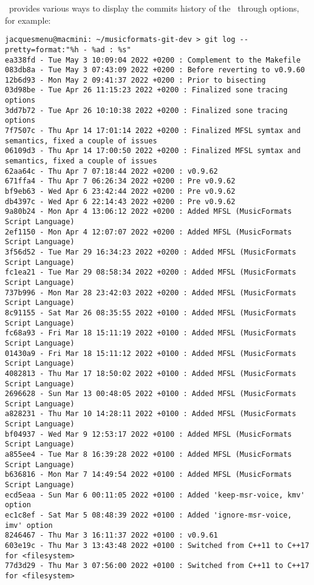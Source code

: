\git\ provides various ways to display the commits history of the \repo\ through  options, for example:
\begin{lstlisting}[language=Terminal]
jacquesmenu@macmini: ~/musicformats-git-dev > git log --pretty=format:"%h - %ad : %s"
ea338fd - Tue May 3 10:09:04 2022 +0200 : Complement to the Makefile
083db8a - Tue May 3 07:43:09 2022 +0200 : Before reverting to v0.9.60
12b6d93 - Mon May 2 09:41:37 2022 +0200 : Prior to bisecting
03d98be - Tue Apr 26 11:15:23 2022 +0200 : Finalized sone tracing options
3dd7b72 - Tue Apr 26 10:10:38 2022 +0200 : Finalized sone tracing options
7f7507c - Thu Apr 14 17:01:14 2022 +0200 : Finalized MFSL symtax and semantics, fixed a couple of issues
06109d3 - Thu Apr 14 17:00:50 2022 +0200 : Finalized MFSL symtax and semantics, fixed a couple of issues
62aa64c - Thu Apr 7 07:18:44 2022 +0200 : v0.9.62
671ffa4 - Thu Apr 7 06:26:34 2022 +0200 : Pre v0.9.62
bf9eb63 - Wed Apr 6 23:42:44 2022 +0200 : Pre v0.9.62
db4397c - Wed Apr 6 22:14:43 2022 +0200 : Pre v0.9.62
9a80b24 - Mon Apr 4 13:06:12 2022 +0200 : Added MFSL (MusicFormats Script Language)
2ef1150 - Mon Apr 4 12:07:07 2022 +0200 : Added MFSL (MusicFormats Script Language)
3f56d52 - Tue Mar 29 16:34:23 2022 +0200 : Added MFSL (MusicFormats Script Language)
fc1ea21 - Tue Mar 29 08:58:34 2022 +0200 : Added MFSL (MusicFormats Script Language)
737b996 - Mon Mar 28 23:42:03 2022 +0200 : Added MFSL (MusicFormats Script Language)
8c91155 - Sat Mar 26 08:35:55 2022 +0100 : Added MFSL (MusicFormats Script Language)
fc68a93 - Fri Mar 18 15:11:19 2022 +0100 : Added MFSL (MusicFormats Script Language)
01430a9 - Fri Mar 18 15:11:12 2022 +0100 : Added MFSL (MusicFormats Script Language)
4082813 - Thu Mar 17 18:50:02 2022 +0100 : Added MFSL (MusicFormats Script Language)
2696628 - Sun Mar 13 00:48:05 2022 +0100 : Added MFSL (MusicFormats Script Language)
a828231 - Thu Mar 10 14:28:11 2022 +0100 : Added MFSL (MusicFormats Script Language)
bf04937 - Wed Mar 9 12:53:17 2022 +0100 : Added MFSL (MusicFormats Script Language)
a855ee4 - Tue Mar 8 16:39:28 2022 +0100 : Added MFSL (MusicFormats Script Language)
b636816 - Mon Mar 7 14:49:54 2022 +0100 : Added MFSL (MusicFormats Script Language)
ecd5eaa - Sun Mar 6 00:11:05 2022 +0100 : Added 'keep-msr-voice, kmv' option
ec1c8ef - Sat Mar 5 08:48:39 2022 +0100 : Added 'ignore-msr-voice, imv' option
8246467 - Thu Mar 3 16:11:37 2022 +0100 : v0.9.61
603e19c - Thu Mar 3 13:43:48 2022 +0100 : Switched from C++11 to C++17 for <filesystem>
77d3d29 - Thu Mar 3 07:56:00 2022 +0100 : Switched from C++11 to C++17 for <filesystem>

\end{lstlisting}
